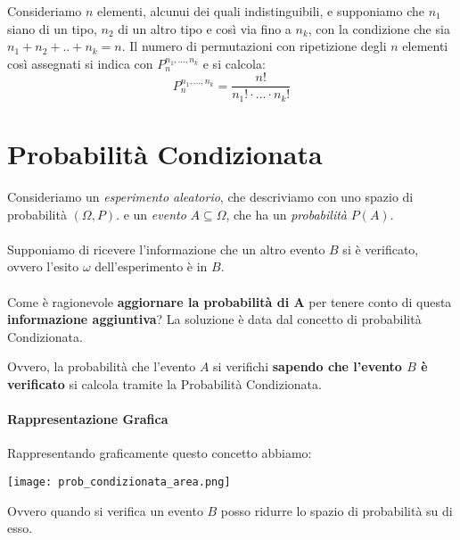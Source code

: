 Consideriamo $n$ elementi, alcunui dei quali indistinguibili, e supponiamo che $n_1$ siano di un tipo, $n_2$ di un altro tipo e così via fino a $n_k$,
con la condizione che sia $n_1+n_2+..+n_k=n$.
Il numero di permutazioni con ripetizione degli $n$ elementi così assegnati si indica con $P_n^{n_1,...,n_k}$ e si calcola:
\[ P_n^{n_1,...,n_k}= \frac{n!}{n_1!\cdot ... \cdot n_k!}\]

\section{Probabilità Condizionata}
Consideriamo un \emph{esperimento aleatorio}, che descriviamo con uno spazio di probabilità $(\Omega, P)$.
e un \emph{evento} $A \subseteq \Omega$, che ha un \emph{probabilità} $P(A)$.
\\\\Supponiamo di ricevere l'informazione che un altro evento $B$ si è verificato, ovvero l'esito $\omega$ dell'esperimento è in $B$.
\\\\Come è ragionevole \textbf{aggiornare la probabilità di A} per tenere conto di questa \textbf{informazione aggiuntiva}?
La soluzione è data dal concetto di probabilità Condizionata.

Ovvero, la probabilità che l'evento $A$ si verifichi \textbf{sapendo che l'evento $B$ è verificato} si calcola tramite la Probabilità Condizionata.
\paragraph*{Rappresentazione Grafica} Rappresentando graficamente questo concetto abbiamo:
\begin{center}
    \texttt{[image: prob\_condizionata\_area.png]}    
\end{center}
Ovvero quando si verifica un evento $B$ posso ridurre lo spazio di probabilità su di esso.

